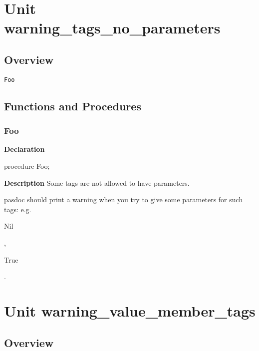 \documentclass{report}
\begin{document}
\chapter{Unit warning{\_}tags{\_}no{\_}parameters}
\section{Overview}
\begin{description}
\item[\texttt{Foo}]
\end{description}
\section{Functions and Procedures}
\subsection*{Foo}
\begin{list}{}{
\setlength{\itemindent}{0cm}
\setlength{\listparindent}{0cm}
\setlength{\leftmargin}{\evensidemargin}
\addtolength{\leftmargin}{\tmplength}
\settowidth{\labelsep}{X}
\addtolength{\leftmargin}{\labelsep}
\setlength{\labelwidth}{\tmplength}
}
\begin{flushleft}
\item[\textbf{Declaration}\hfill]
\begin{ttfamily}
procedure Foo;\end{ttfamily}


\end{flushleft}
\par
\item[\textbf{Description}]
Some tags are not allowed to have parameters.

pasdoc should print a warning when you try to give some parameters for such tags: e.g. \begin{ttfamily}Nil\end{ttfamily}, \begin{ttfamily}True\end{ttfamily}.

\end{list}
\chapter{Unit warning{\_}value{\_}member{\_}tags}
\section{Overview}
\begin{description}
\item[\texttt{\begin{ttfamily}TMyClass\end{ttfamily} Class}]
\end{description}
\end{document}
